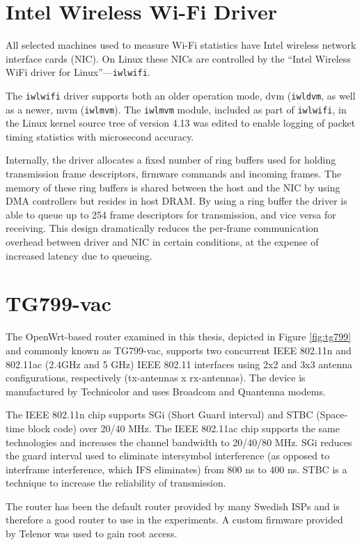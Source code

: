 \section{Intel Wireless Wi-Fi Driver}

All selected machines used to measure Wi-Fi statistics have Intel wireless
network interface cards (NIC). On Linux these NICs are controlled by the ``Intel
Wireless WiFi driver for Linux''—\texttt{iwlwifi}. 

The \texttt{iwlwifi} driver supports both an older operation mode, dvm
(\texttt{iwldvm}, as well as a newer, mvm (\texttt{iwlmvm}). The
\texttt{iwlmvm} module, included as part of \texttt{iwlwifi}, in the Linux
kernel source tree of version 4.13 was edited to enable logging of packet
timing statistics with microsecond accuracy.

Internally, the driver allocates a fixed number of ring buffers used for
holding transmission frame descriptors, firmware commands and incoming frames.
The memory of these ring buffers is shared between the host and the NIC by
using DMA controllers but resides in host DRAM. By using a ring buffer the
driver is able to queue up to 254 frame descriptors for transmission, and vice
versa for receiving. This design dramatically reduces the per-frame
communication overhead between driver and NIC in certain conditions, at the
expense of increased latency due to queueing.


\section{TG799-vac}

The OpenWrt-based router examined in this thesis, depicted in Figure
\ref{fig:tg799} and commonly known as TG799-vac, supports two concurrent IEEE
802.11n and 802.11ac (2.4GHz and 5 GHz) IEEE 802.11 interfaces using 2x2 and
3x3 antenna configurations, respectively (tx-antennas x rx-antennas).  The
device is manufactured by Technicolor and uses Broadcom and Quantenna modems.

The IEEE 802.11n chip supports SGi (Short Guard interval) and STBC (Space-time
block code) over 20/40 MHz. The IEEE 802.11ac chip supports the same
technologies and increases the channel bandwidth to 20/40/80 MHz. SGi reduces
the guard interval used to eliminate intersymbol interference (as opposed to
interframe interference, which IFS eliminates) from 800 ns to 400 ns. STBC is
a technique to increase the reliability of transmission.

The router has been the default router provided by many Swedish ISPs and is
therefore a good router to use in the experiments. A custom firmware provided
by Telenor was used to gain root access.

